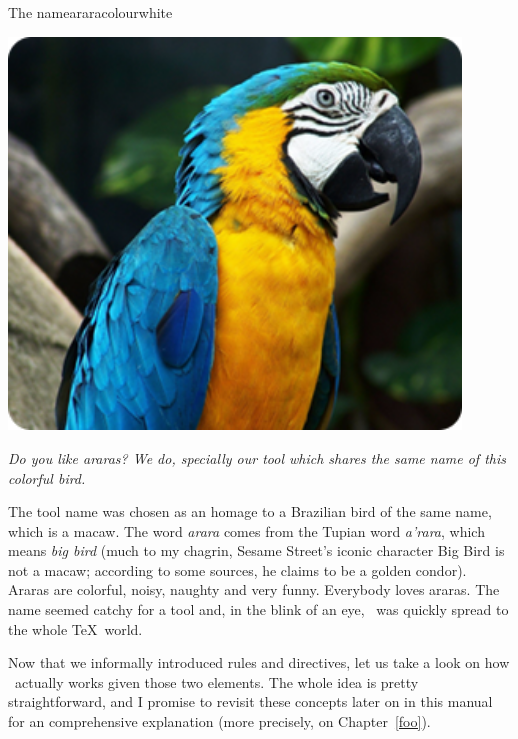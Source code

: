 \begin{messagebox}{The name}{araracolour}{\icok}{white}
\begin{minipage}{0.45\textwidth}
\vspace{.8em}
{\centering\includegraphics[width=0.9\textwidth]{figures/arara.png}\par}

\vspace{.7em}

\em Do you like araras? We do, specially our tool which shares the same name of this colorful bird.
\end{minipage}\hspace{1em}
\begin{minipage}{0.5\textwidth}
The tool name was chosen as an homage to a Brazilian bird of the same name, which is a macaw. The word \emph{arara} comes from the Tupian word \emph{a'rara}, which means \emph{big bird} (much to my chagrin, Sesame Street's iconic character Big Bird is not a macaw; according to some sources, he claims to be a golden condor). Araras are colorful, noisy, naughty and very funny. Everybody loves araras. The name seemed catchy for a tool and, in the blink of an eye, \arara\ was quickly spread to the whole \TeX\ world.
\end{minipage}
\end{messagebox}

Now that we informally introduced rules and directives, let us take a look on how \arara\ actually works given those two elements. The whole idea is pretty straightforward, and I promise to revisit these concepts later on in this manual for an comprehensive explanation (more precisely, on Chapter~\ref{foo}).


